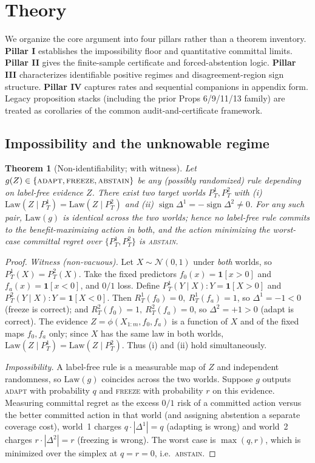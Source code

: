 \documentclass[11pt]{article}
\theoremstyle{plain}
\newtheorem{theorem}{Theorem}
\theoremstyle{definition}
\newcommand{\sign}{\operatorname{sign}}
\newcommand{\Law}{\mathrm{Law}}
\begin{document}
\section{Theory}
We organize the core argument into four pillars rather than a theorem inventory.
\textbf{Pillar I} establishes the impossibility floor and quantitative committal limits.
\textbf{Pillar II} gives the finite-sample certificate and forced-abstention logic.
\textbf{Pillar III} characterizes identifiable positive regimes and disagreement-region
sign structure. \textbf{Pillar IV} captures rates and sequential companions in appendix
form. Legacy proposition stacks (including the prior Props 6/9/11/13 family) are
treated as corollaries of the common audit-and-certificate framework.
\subsection{Impossibility and the unknowable regime}\label{sec:imp}
\begin{theorem}[Non-identifiability; with witness]\label{thm:imp}
Let $g(Z)\in\{\textsc{adapt},\textsc{freeze},\textsc{abstain}\}$ be any (possibly
randomized) rule depending on label-free evidence $Z$. There exist two target worlds
$P_T^1,P_T^2$ with
\textup{(i)} $\Law(Z\mid P_T^1)=\Law(Z\mid P_T^2)$ and
\textup{(ii)} $\sign\Delta^1=-\sign\Delta^2\neq 0$.
For any such pair, $\Law(g)$ is identical across the two worlds; hence no label-free
rule commits to the benefit-maximizing action in both, and the action minimizing the
worst-case committal regret over $\{P_T^1,P_T^2\}$ is \textsc{abstain}.
\end{theorem}
\begin{proof}
\emph{Witness (non-vacuous).} Let $X\sim\mathcal N(0,1)$ under \emph{both} worlds, so
$P_T^1(X)=P_T^2(X)$. Take the fixed predictors $f_0(x)=\mathbf 1[x>0]$ and
$f_a(x)=\mathbf 1[x<0]$, and $0/1$ loss. Define
$P_T^1(Y\mid X)\colon Y=\mathbf 1[X>0]$ and $P_T^2(Y\mid X)\colon Y=\mathbf 1[X<0]$.
Then $R_T^1(f_0)=0,\ R_T^1(f_a)=1$, so $\Delta^1=-1<0$ (freeze is correct); and
$R_T^2(f_0)=1,\ R_T^2(f_a)=0$, so $\Delta^2=+1>0$ (adapt is correct). The evidence
$Z=\phi(X_{1:m},f_0,f_a)$ is a function of $X$ and of the fixed maps $f_0,f_a$ only;
since $X$ has the same law in both worlds, $\Law(Z\mid P_T^1)=\Law(Z\mid P_T^2)$.
Thus (i) and (ii) hold simultaneously.

\emph{Impossibility.} A label-free rule is a measurable map of $Z$ and independent
randomness, so $\Law(g)$ coincides across the two worlds. Suppose $g$ outputs
\textsc{adapt} with probability $q$ and \textsc{freeze} with probability $r$ on this
evidence. Measuring committal regret as the excess $0/1$ risk of a committed action
versus the better committed action in that world (and assigning abstention a separate
coverage cost), world~1 charges $q\cdot|\Delta^1|=q$ (adapting is wrong) and world~2
charges $r\cdot|\Delta^2|=r$ (freezing is wrong). The worst case is $\max(q,r)$, which
is minimized over the simplex at $q=r=0$, i.e.\ \textsc{abstain}. \qedhere
\end{proof}
\end{document}
